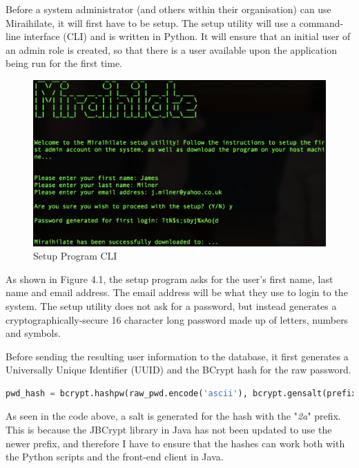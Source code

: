 Before a system administrator (and others within their organisation) can use Miraihilate, it will first have to be setup. The setup utility will use a command-line interface (CLI) and is written in Python. It will ensure that an initial user of an admin role is created, so that there is a user available upon the application being run for the first time.

\vspace{0.5cm}

\begin{figure}[h]
	\centering
	\includegraphics[width=1\linewidth]{img/setup_interface_screenshot.png}
	\caption{Setup Program CLI}
\end{figure}

As shown in Figure 4.1, the setup program asks for the user's first name, last name and email address. The email address will be what they use to login to the system. The setup utility does not ask for a password, but instead generates a cryptographically-secure 16 character long password made up of letters, numbers and symbols.

\vspace{0.5cm}

Before sending the resulting user information to the database, it first generates a Universally Unique Identifier (UUID) and the BCrypt hash for the raw password.

\begin{lstlisting}[language=Python, caption=Hashing a raw password using BCrypt]
pwd_hash = bcrypt.hashpw(raw_pwd.encode('ascii'), bcrypt.gensalt(prefix=b"2a"))
\end{lstlisting}

As seen in the code above, a salt is generated for the hash with the "\textit{2a}" prefix. This is because the JBCrypt library in Java has not been updated to use the newer prefix, and therefore I have to ensure that the hashes can work both with the Python scripts and the front-end client in Java.
